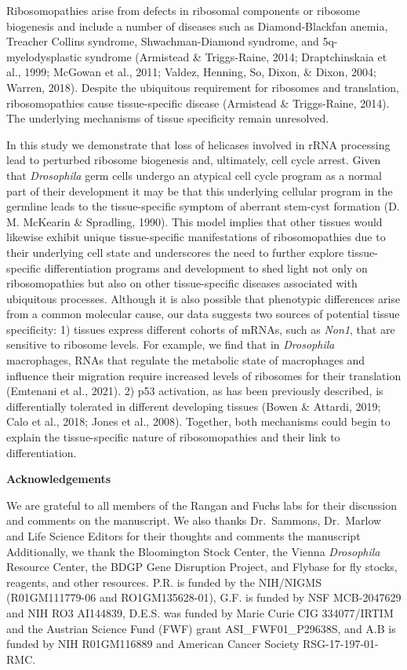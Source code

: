 \documentclass[12pt,oneside]{reedthesis}
\begin{document}
Ribosomopathies arise from defects in ribosomal components or ribosome biogenesis and include a number of diseases such as Diamond-Blackfan anemia, Treacher Collins syndrome, Shwachman-Diamond syndrome, and 5q-myelodysplastic syndrome (Armistead \& Triggs-Raine, 2014; Draptchinskaia et al., 1999; McGowan et al., 2011; Valdez, Henning, So, Dixon, \& Dixon, 2004; Warren, 2018). Despite the ubiquitous requirement for ribosomes and translation, ribosomopathies cause tissue-specific disease (Armistead \& Triggs-Raine, 2014). The underlying mechanisms of tissue specificity remain unresolved.

In this study we demonstrate that loss of helicases involved in rRNA processing lead to perturbed ribosome biogenesis and, ultimately, cell cycle arrest. Given that \emph{Drosophila} germ cells undergo an atypical cell cycle program as a normal part of their development it may be that this underlying cellular program in the germline leads to the tissue-specific symptom of aberrant stem-cyst formation (D. M. McKearin \& Spradling, 1990). This model implies that other tissues would likewise exhibit unique tissue-specific manifestations of ribosomopathies due to their underlying cell state and underscores the need to further explore tissue-specific differentiation programs and development to shed light not only on ribosomopathies but also on other tissue-specific diseases associated with ubiquitous processes. Although it is also possible that phenotypic differences arise from a common molecular cause, our data suggests two sources of potential tissue specificity: 1) tissues express different cohorts of mRNAs, such as \emph{Non1}, that are sensitive to ribosome levels. For example, we find that in \emph{Drosophila} macrophages, RNAs that regulate the metabolic state of macrophages and influence their migration require increased levels of ribosomes for their translation (Emtenani et al., 2021). 2) p53 activation, as has been previously described, is differentially tolerated in different developing tissues (Bowen \& Attardi, 2019; Calo et al., 2018; Jones et al., 2008). Together, both mechanisms could begin to explain the tissue-specific nature of ribosomopathies and their link to differentiation.

\textbf{Acknowledgements}

We are grateful to all members of the Rangan and Fuchs labs for their discussion and comments on the manuscript. We also thanks Dr.~Sammons, Dr.~Marlow and Life Science Editors for their thoughts and comments the manuscript Additionally, we thank the Bloomington Stock Center, the Vienna \emph{Drosophila} Resource Center, the BDGP Gene Disruption Project, and Flybase for fly stocks, reagents, and other resources. P.R. is funded by the NIH/NIGMS (R01GM111779-06 and RO1GM135628-01), G.F. is funded by NSF MCB-2047629 and NIH RO3 AI144839, D.E.S. was funded by Marie Curie CIG 334077/IRTIM and the Austrian Science Fund (FWF) grant ASI\_FWF01\_P29638S, and A.B is funded by NIH R01GM116889 and American Cancer Society RSG-17-197-01-RMC.
\end{document}
